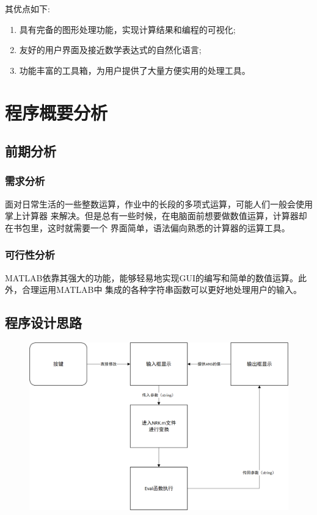 \documentclass[AutoFakeBold]{LZUThesis}
\begin{document}
其优点如下:
\begin{enumerate}
    \item 具有完备的图形处理功能，实现计算结果和编程的可视化;
    \item 友好的用户界面及接近数学表达式的自然化语言;
    \item 功能丰富的工具箱，为用户提供了大量方便实用的处理工具。
\end{enumerate}

\chapter{程序概要分析}

\section{前期分析}
\subsection{需求分析}
面对日常生活的一些整数运算，作业中的长段的多项式运算，可能人们一般会使用掌上计算器
来解决。但是总有一些时候，在电脑面前想要做数值运算，计算器却在书包里，这时就需要一个
界面简单，语法偏向熟悉的计算器的运算工具。
\subsection{可行性分析}
MATLAB依靠其强大的功能，能够轻易地实现GUI的编写和简单的数值运算。此外，合理运用MATLAB中
集成的各种字符串函数可以更好地处理用户的输入。
\newpage
\section{程序设计思路}
\begin{figure}[htbp]
    \centering
    \includegraphics[keepaspectratio,width=400pt]{./figures/flow.png}
\end{figure}
\end{document}
